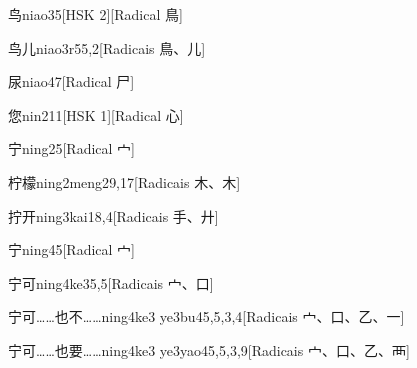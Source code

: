 \begin{entry}{鸟}{niao3}{5}[HSK 2][Radical ⿃]
\end{entry}

\begin{entry}{鸟儿}{niao3r5}{5,2}[Radicais ⿃、⼉]
\end{entry}

\begin{entry}{尿}{niao4}{7}[Radical ⼫]
\end{entry}

\begin{entry}{您}{nin2}{11}[HSK 1][Radical ⼼]
\end{entry}

\begin{entry}{宁}{ning2}{5}[Radical ⼧]
\end{entry}

\begin{entry}{柠檬}{ning2meng2}{9,17}[Radicais ⽊、⽊]
\end{entry}

\begin{entry}{拧开}{ning3kai1}{8,4}[Radicais ⼿、⼶]
\end{entry}

\begin{entry}{宁}{ning4}{5}[Radical ⼧]
\end{entry}

\begin{entry}{宁可}{ning4ke3}{5,5}[Radicais ⼧、⼝]
\end{entry}

\begin{entry}{宁可……也不……}{ning4ke3 ye3bu4}{5,5,3,4}[Radicais ⼧、⼝、⼄、⼀]
\end{entry}

\begin{entry}{宁可……也要……}{ning4ke3 ye3yao4}{5,5,3,9}[Radicais ⼧、⼝、⼄、⾑]
\end{entry}

